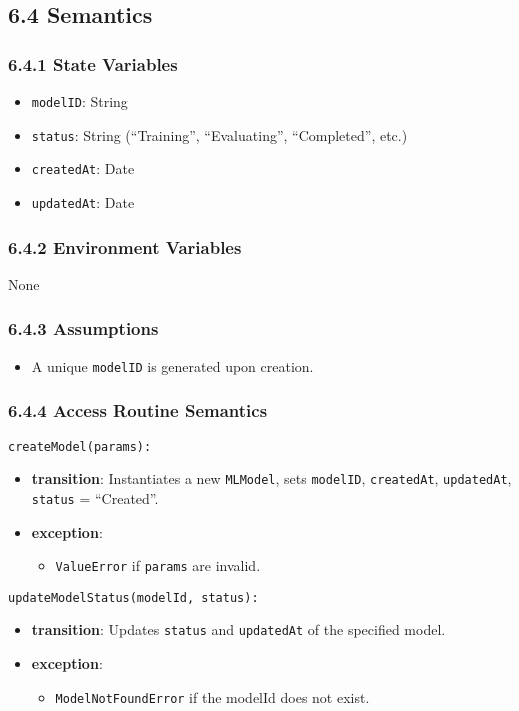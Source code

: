 \documentclass[12pt, titlepage]{article}
\begin{document}
\subsection{6.4 Semantics}

\subsubsection{6.4.1 State Variables}
\begin{itemize}
    \item \texttt{modelID}: String
    \item \texttt{status}: String (``Training'', ``Evaluating'', ``Completed'', etc.)
    \item \texttt{createdAt}: Date
    \item \texttt{updatedAt}: Date
\end{itemize}

\subsubsection{6.4.2 Environment Variables}
None

\subsubsection{6.4.3 Assumptions}
\begin{itemize}
    \item A unique \texttt{modelID} is generated upon creation.
\end{itemize}

\subsubsection{6.4.4 Access Routine Semantics}
\noindent \texttt{createModel(params):}
\begin{itemize}
    \item \textbf{transition}: Instantiates a new \texttt{MLModel}, sets \texttt{modelID}, \texttt{createdAt}, \texttt{updatedAt}, \texttt{status} = ``Created''.
    \item \textbf{exception}:
    \begin{itemize}
        \item \texttt{ValueError} if \texttt{params} are invalid.
    \end{itemize}
\end{itemize}

\noindent \texttt{updateModelStatus(modelId, status):}
\begin{itemize}
    \item \textbf{transition}: Updates \texttt{status} and \texttt{updatedAt} of the specified model.
    \item \textbf{exception}:
    \begin{itemize}
        \item \texttt{ModelNotFoundError} if the modelId does not exist.
    \end{itemize}
\end{itemize}
\end{document}
